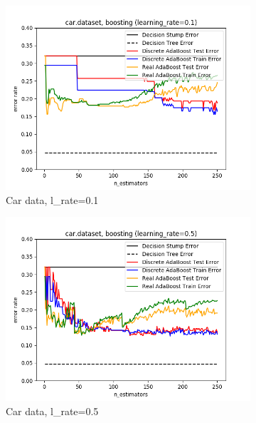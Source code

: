 \documentclass{article}
\begin{document}
    \begin{figure}[htb]
    \centering

    \begin{subfigure}{0.33\textwidth}
      \includegraphics[width=\linewidth]{out/boosting/car-error-lrate-0.1.png}
      \caption{Car data, l\_rate=0.1}
      \label{fig:boosting-param-1}
    \end{subfigure}\hfil
    \begin{subfigure}{0.33\textwidth}
      \includegraphics[width=\linewidth]{out/boosting/car-error-lrate-0.5.png}
      \caption{Car data, l\_rate=0.5}
      \label{fig:boosting-param-2}
    \end{subfigure}\hfil
    \begin{subfigure}{0.33\textwidth}

\end{subfigure}
\end{figure}
\end{document}
